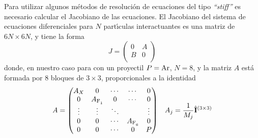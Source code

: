 Para utilizar algunos m\'{e}todos de resoluci\'{o}n de ecuaciones del tipo \emph{``stiff''} es necesario calcular el Jacobiano de las ecuaciones.
El Jacobiano del sistema de ecuaciones diferenciales para $N$ part\'{\i}culas interactuantes es una matriz de $6N \times 6N$, y tiene la forma
\begin{equation}
  \label{Q:Jacob-ec-dif}
  J =
  \begin{pmatrix}
    0 & A \\
    B & 0 \\
  \end{pmatrix}
\end{equation}
donde, en nuestro caso para  con un proyectil $P=\ce{Ar}$, $N=8$, y la matriz $A$ est\'{a} formada por 8 bloques de $3 \times 3$, proporcionales a la identidad
\begin{align}
  \label{Q:Jacob-ec-dif-A}
  A &=
\begin{pmatrix}
  A_{X} & 0 & \cdots &  \cdots & 0 \\
  0 & A_{\ce{F1}}& 0 & \cdots & 0 \\
  \vdots  & \vdots  & \ddots &  & \vdots  \\
  0 &  0 &\cdots &  A_{\ce{F6}} & 0 \\
  0 & 0 & \cdots & 0 & P
\end{pmatrix}    &A_{j} = \frac{1}{M_{j}} \oper{I}^{(3\times 3)}
\end{align}

